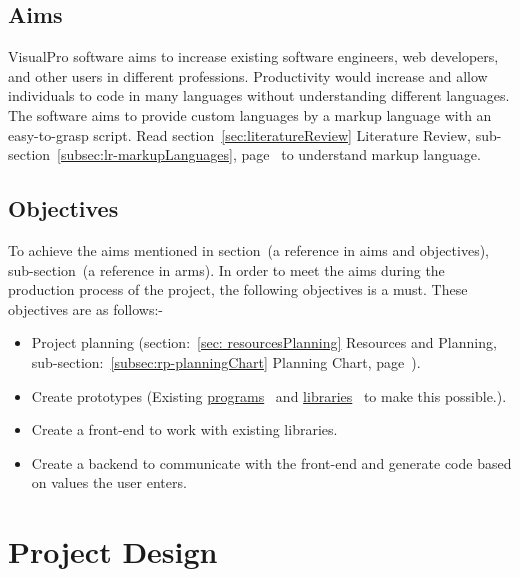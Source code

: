 \documentclass[conference]{IEEEtran}
\begin{document}
      \subsection{Aims}
        VisualPro software aims to increase existing software engineers, web developers, and other users in different professions. Productivity would increase and allow individuals to code in many languages without understanding different languages. The software aims to provide custom languages by a markup language with an easy-to-grasp script. Read section~\ref{sec:literatureReview} Literature Review, sub-section~\ref{subsec:lr-markupLanguages}, page~\pageref{subsec:lr-markupLanguages} to understand markup language.
      \subsection{Objectives}
        To achieve the aims mentioned in section~(a reference in aims and objectives), sub-section~(a reference in arms). In order to meet the aims during the production process of the project, the following objectives is a must. These objectives are as follows:-
        \begin{itemize}
          \item Project planning (section:~\ref{sec: resourcesPlanning} Resources and Planning, sub-section:~\ref{subsec:rp-planningChart} Planning Chart, page~\pageref{subsec:rp-planningChart}).
          \item Create prototypes (Existing \href{https://github.com/ShinkuKira21/VisualPro-FinalProject/tree/main/Experience}{programs}~\cite{patch_programming_2021} and \href{https://github.com/ShinkuKira21/VisualPro-FinalProject/tree/main/Libraries}{libraries}~\cite{patch_libraries_2021} to make this possible.).
          \item Create a front-end to work with existing libraries.
          \item Create a backend to communicate with the front-end and generate code based on values the user enters.
        \end{itemize}
      
    \section{Project Design}
\end{document}
